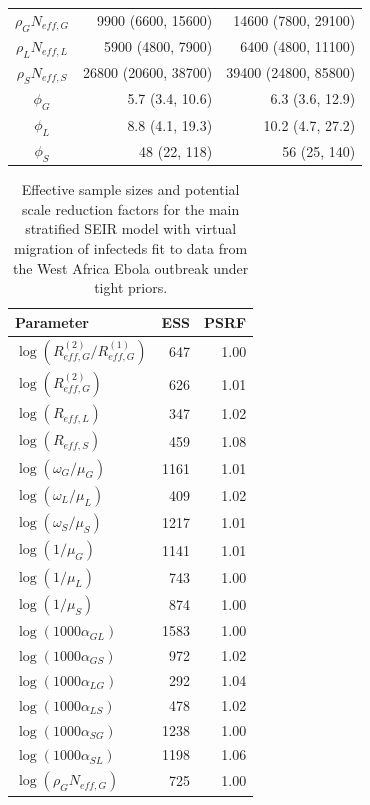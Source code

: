 \begin{table}[htbp]
\begin{tabular}{crr}
		$ \rho_GN_{eff,G} $& 9900 (6600, 15600) & 14600 (7800, 29100) \\ 
		$ \rho_{L}N_{eff,L} $& 5900 (4800, 7900) & 6400 (4800, 11100) \\ 
		$ \rho_SN_{eff,S} $& 26800 (20600, 38700) & 39400 (24800, 85800) \\ 
		$ \phi_G $& 5.7 (3.4, 10.6) & 6.3 (3.6, 12.9) \\ 
		$ \phi_L $& 8.8 (4.1, 19.3) & 10.2 (4.7, 27.2) \\ 
		$ \phi_S $& 48 (22, 118) & 56 (25, 140) \\ 
		\hline
	\end{tabular}
\end{table}

\begin{table}[htbp]
	\caption{Effective sample sizes and potential scale reduction factors for the main stratified SEIR model with virtual migration of infecteds fit to data from the West Africa Ebola outbreak under tight priors.}
	\centering\footnotesize
	\begin{tabular}{lrr}
		\hline
		\textbf{Parameter} & \textbf{ESS} & \textbf{PSRF} \\ 
		\hline
		$ \log(R_{eff,G}^{(2)}/R_{eff,G}^{(1)}) $& 647 & 1.00 \\ 
		$ \log(R_{eff,G}^{(2)}) $& 626 & 1.01 \\ 
		$ \log(R_{eff,L}) $& 347 & 1.02 \\ 
		$ \log(R_{eff,S}) $& 459 & 1.08 \\ 
		$ \log(\omega_G/\mu_G) $& 1161 & 1.01 \\ 
		$ \log(\omega_L/\mu_L) $& 409 & 1.02 \\ 
		$ \log(\omega_S/\mu_S) $& 1217 & 1.01 \\ 
		$ \log(1/\mu_G) $& 1141 & 1.01 \\ 
		$ \log(1/\mu_L) $& 743 & 1.00 \\ 
		$ \log(1/\mu_S) $& 874 & 1.00 \\ 
		$ \log(1000\alpha_{GL}) $& 1583 & 1.00 \\ 
		$ \log(1000\alpha_{GS}) $& 972 & 1.02 \\ 
		$ \log(1000\alpha_{LG}) $& 292 & 1.04 \\ 
		$ \log(1000\alpha_{LS}) $& 478 & 1.02 \\ 
		$ \log(1000\alpha_{SG}) $& 1238 & 1.00 \\ 
		$ \log(1000\alpha_{SL}) $& 1198 & 1.06 \\ 
		$ \log(\rho_GN_{eff,G}) $& 725 & 1.00 \\ 

\end{tabular}
\end{table}

